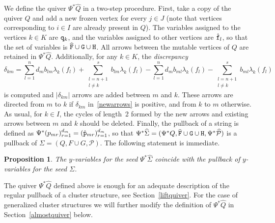 \documentclass{amsart}
\newtheorem{proposition}[theorem]{Proposition}
\theoremstyle{definition}
\theoremstyle{remark}
\numberwithin{equation}{section}
\numberwithin{theorem}{section}
\def\P{{\mathcal P}}
\def\ttf{{\tt f}}
\def\ttp{{\tt p}}
\def\ttq{{\tt q}}
\def\ttF{{\tt F}}
\def\ttG{{\tt G}}
\def\ttH{{\tt H}}
\begin{document}
We define the quiver $\Psi^*\widehat Q$ in a two-step procedure. First, take a copy of the quiver $Q$ and add a new frozen vertex for every $j\in J$ (note that vertices corresponding to $i\in I$ are already present in $Q$). The variables assigned to the vertices $k\in K$ are $\ttq_k$, and the variables assigned to other vertices are $\hat\ttf_l$, so that the set of variables is 
$\widehat\ttF\cup\ttG\cup\ttH$. All arrows between the mutable vertices of $Q$ are retained in 
$\Psi^*\widehat Q$. Additionally, for any $k\in K$, the {\it discrepancy\/}
\begin{equation}\label{newarrows}
\delta_{km}=\sum_{l=1}^n d_mb_{lm}\lambda_k(f_l)+\sum_{\substack {l=n+1\\ l\ne k}}^s b_{lm}\lambda_k(f_l)
-\sum_{l=1}^n d_mb_{ml}\lambda_k(f_l)  - \sum_{\substack {l=n+1\\ l\ne k}}^s b_{ml}\lambda_k(f_l)
\end{equation}
is computed and $|\delta_{km}|$ 
arrows are added between $m$ and $k$. These arrows are directed from $m$ to $k$ if $\delta_{km}$ in~\eqref{newarrows} is positive, and from $k$ to $m$ otherwise. As usual, for $k\in I$, the cycles of length~2 formed by the new arrows and existing arrows between $m$ and $k$ should be deleted.  Finally, the pullback of a string 
is defined as $\Psi^*(p_{mr})_{r=1}^{d_m} = (\hat \ttp_{mr})_{r=1}^{d_m}$, so that $\Psi^*\widehat\Sigma=(\Psi^*Q,
\widehat \ttF\cup\ttG\cup\ttH, \Psi^*\widehat\P)$ is a pullback of $\Sigma=(Q,F\cup G,\P)$. 
The following statement is immediate.

\begin{proposition}\label{ypullback}
The $y$-variables for the seed $\Psi^*\widehat\Sigma$ coincide with the pullback of $y$-variables for the seed $\Sigma$.
\end{proposition}

The quiver $\Psi^*\widehat Q$ defined above is enough for an adequate description of the regular pullback of a cluster structure, see Section~\ref{liftquiver}. For the case of generalized cluster structures we will further modify the definition of $\Psi^*\widehat Q$ in
Section~\ref{almostquiver} below.
\end{document}
